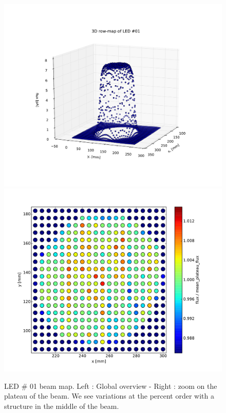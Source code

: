 \documentclass[\docopts]{\docclass}
\begin{document}
\begin{figure}[ht]
  \centering
  \includegraphics[width=0.45\linewidth]{led-01_3d-map.pdf}
  \includegraphics[width=0.45\linewidth]{led-01_plateau-map.pdf}
  \caption{LED \# 01 beam map. Left : Global overview - Right : zoom
    on the plateau of the beam. We see variations at the percent order
    with a structure in the middle of the beam.}
  \label{fig:beam_map}
\end{figure}
\end{document}
